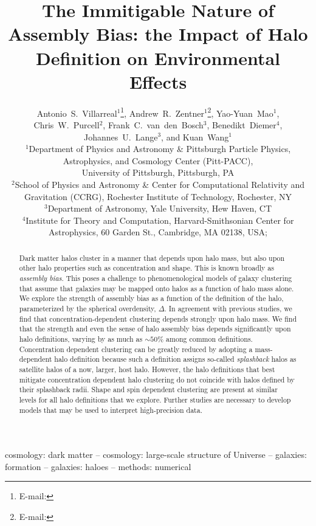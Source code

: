 \documentclass[usenatbib,fleqn]{mnras}
\title[The Immitigable Nature of Assembly Bias]{The Immitigable Nature of Assembly
Bias: the Impact of Halo Definition on Environmental Effects}
\author[A.~S.~Villarreal et al.]{%
Antonio~S.~Villarreal$^{1}$\thanks{E-mail: \email{asv13@pitt.edu}},
Andrew~R.~Zentner$^{1}$\thanks{E-mail: \email{zentner@pitt.edu}},
Yao-Yuan~Mao$^{1}$, %
Chris~W.~Purcell$^{2}$,%
\newauthor
Frank~C.~van~den~Bosch$^{3}$, %
Benedikt~Diemer$^{4}$, %
Johannes~U.~Lange$^{3}$,
and Kuan~Wang$^{1}$
\vspace*{8pt}
\\
$^{1}$Department of Physics and Astronomy \& Pittsburgh Particle Physics, Astrophysics, and Cosmology Center (Pitt-PACC), \\
\phantom{$^{1}$}University of Pittsburgh, Pittsburgh, PA\\
$^{2}$School of Physics and Astronomy \& Center for Computational Relativity and Gravitation (CCRG), Rochester Institute of Technology, Rochester, NY \\
$^{3}$Department of Astronomy, Yale University, Hew Haven, CT\\
$^{4}$Institute for Theory and Computation, Harvard-Smithsonian Center for Astrophysics, 60 Garden St., Cambridge, MA 02138, USA;}
\begin{document}
\label{firstpage}
\pagerange{\pageref{firstpage}--\pageref{lastpage}} 

\maketitle

\begin{abstract}

Dark matter halos cluster in a manner that depends upon halo mass, but 
also upon other halo properties such as concentration and shape. This is known broadly as {\em assembly bias}. This poses a challenge to phenomenological models of galaxy clustering that assume that galaxies may be mapped onto halos as a function of halo mass alone. We explore the strength of assembly bias as a function of the definition of the halo, parameterized by the spherical overdensity, $\Delta$. In agreement with 
previous studies, we find that concentration-dependent clustering 
depends strongly upon halo mass. We find that the strength and 
even the sense of halo assembly bias depends significantly upon halo 
definitions, varying by as much as $\sim 50\%$ among common definitions. 
Concentration dependent clustering can be greatly reduced by adopting a mass-dependent halo definition because such a definition assigns so-called 
{\em splashback} halos as satellite halos of a now, larger, host halo. However, the halo definitions that best mitigate concentration dependent halo clustering do not coincide with halos defined by their splashback radii. Shape and spin dependent clustering are present at similar levels for all halo definitions that we explore. Further studies are necessary 
to develop models that may be used to interpret high-precision data.

\end{abstract}

\begin{keywords}
cosmology: dark matter -- cosmology: large-scale structure of Universe -- galaxies: formation -- galaxies: haloes -- methods: numerical
\end{keywords}

\end{document}
